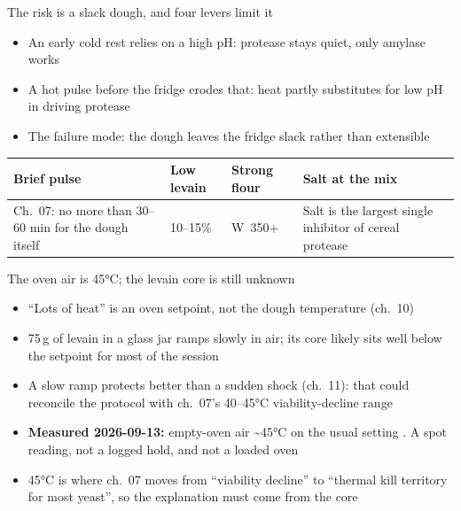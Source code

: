 \documentclass[aspectratio=169,11pt]{beamer}
\newcommand{\ca}{\textasciitilde}
\newcommand{\tablesetup}{\renewcommand{\arraystretch}{1.2}\setlength{\tabcolsep}{4pt}}
\newenvironment{tablebox}[1][\footnotesize]{\par\tablesetup#1}{\par}
\begin{document}
\begin{frame}{The risk is a slack dough, and four levers limit it}
  \begin{itemize}
    \item An early cold rest relies on a high pH: protease stays quiet, only amylase works
    \item A hot pulse before the fridge erodes that: heat partly substitutes for low pH in driving protease
    \item The failure mode: the dough leaves the fridge slack rather than extensible
  \end{itemize}
  \smallskip
  \begin{tablebox}
  \begin{tabularx}{\linewidth}{@{}YYYY@{}}
    \toprule
    \textbf{Brief pulse} & \textbf{Low levain} & \textbf{Strong flour} & \textbf{Salt at the mix} \\
    \midrule
    Ch.~07: no more than 30--60 min for the dough itself & 10--15\% & W~350+ & Salt is the largest single inhibitor of cereal protease \\
    \bottomrule
  \end{tabularx}
  \end{tablebox}
\end{frame}

\begin{frame}{The oven air is 45°C; the levain core is still unknown}
  \begin{itemize}
    \item “Lots of heat” is an oven setpoint, not the dough temperature (ch.~10)
    \item 75\,g of levain in a glass jar ramps slowly in air; its core likely sits well below the setpoint for most of the session \hypothesis
    \item A slow ramp protects better than a sudden shock (ch.~11): that could reconcile the protocol with ch.~07's 40--45°C viability-decline range
    \item \textbf{Measured 2026-09-13:} empty-oven air \ca45°C on the usual setting \ownresult. A spot reading, not a logged hold, and not a loaded oven
    \item 45°C is where ch.~07 moves from “viability decline” to “thermal kill territory for most yeast”, so the explanation must come from the core
  \end{itemize}
\end{frame}
\end{document}
